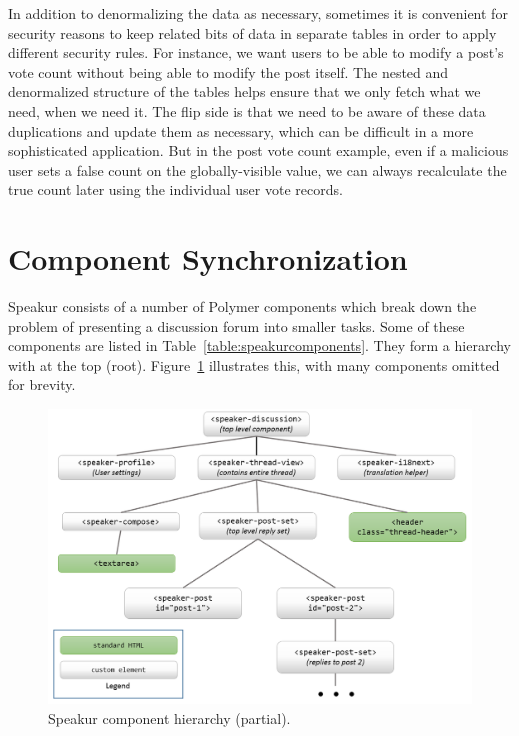 In addition to denormalizing the data as necessary, sometimes it is convenient for security reasons to 
keep related bits of data in separate tables in order to apply different security rules.
For instance, we want users to be able to modify a post's vote count without being able to modify the post itself.
The nested and denormalized structure of the tables helps ensure that we only fetch what we need, when we need it.
The flip side is that we need to be aware of these data duplications and update them as necessary, 
which can be difficult in a more sophisticated application.
But in the post vote count example, even if a malicious user sets a false count on the globally-visible value,
we can always recalculate the true count later using the individual user vote records.

\section{Component Synchronization}
\label{sec:sync}

Speakur consists of a number of Polymer components which break down the problem of presenting a discussion forum into smaller tasks.
Some of these components are listed in Table~\ref{table:speakurcomponents}.
They form a hierarchy with  at the top (root). 
Figure~\ref{f:component_layout} illustrates this, with many components omitted for brevity.

\begin{figure}[htb]
	\centerline{\includegraphics[width=6in]{images/components.png}}
	\caption{Speakur component hierarchy (partial).}
	\label{f:component_layout}
\end{figure}

